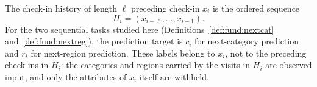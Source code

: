 \begin{definition}\label{def:fund:history}
The check-in history of length $\ell$ preceding check-in $x_i$ is the ordered sequence
\begin{equation}
    H_i=(x_{i-\ell},\ldots,x_{i-1}).
\end{equation}
For the two sequential tasks studied here (Definitions~\ref{def:fund:nextcat}
and~\ref{def:fund:nextreg}), the prediction target is $c_i$ for next-category
prediction and $r_i$ for next-region prediction. These labels belong to $x_i$, not
to the preceding check-ins in $H_i$: the categories and regions carried by the
visits in $H_i$ are observed input, and only the attributes of $x_i$ itself are
withheld.
\end{definition}
